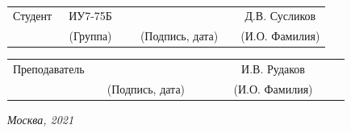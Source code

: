 \documentclass[14pt, a4paper]{extarticle}
\begin{document}
	
	\noindent
	
	\noindent
	\\
	
	\vspace{1.5cm}
	\noindent
	\begin{tabular}{l c c c c c}
		Студент      & ~ИУ7-75Б~               & \hspace{2.5cm} & \hspace{2cm}                 & &  Д.В. 
		Сусликов \\\cline{2-2}\cline{4-4} \cline{6-6} 
		\hspace{3cm} & {\footnotesize(Группа)} &                & {\footnotesize(Подпись, дата)} & & {\footnotesize(И.О. Фамилия)}
	\end{tabular}
	
	\noindent
	\begin{tabular}{l c c c c}
		Преподаватель & \hspace{5cm}   & \hspace{2cm}                 & & ~~~~~~И.В. Рудаков~~~~~~\\\cline{3-3} \cline{5-5} 
		\hspace{3cm}  &                & {\footnotesize(Подпись, дата)} & & {\footnotesize(И.О. Фамилия)}
	\end{tabular}
	
	\vspace{0.6cm}
	\begin{center}	
		\vfill
		\large \textit {Москва, 2021}
	\end{center}
	
	\thispagestyle {empty}
	\pagebreak
	
	\clearpage
	\tableofcontents
		
	\clearpage
\end{document}
